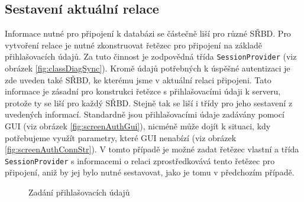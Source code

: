 \documentclass[czech,bachelor,public,dept460,male,oneside]{diploma}
\begin{document}
%			
	
	\subsection{Sestavení aktuální relace}
	Informace nutné pro připojení k databázi se částečně liší pro různé SŘBD. Pro vytvoření relace je nutné zkonstruovat řetězec pro připojení na základě přihlašovacích údajů. Za tuto činnost je zodpovědná třída \texttt{SessionProvider} (viz obrázek \ref{fig:classDiagSync}). Kromě údajů potřebných k úspěšné autentizaci je zde uveden také SŘBD, ke kterému jsme v aktuální relaci připojeni. Tato informace je zásadní pro konstrukci řetězce s přihlašovacími údaji k serveru, protože ty se liší pro každý SŘBD. Stejně tak se liší i třídy pro jeho sestavení z uvedených informací. Standardně jsou přihlašovacími údaje zadávány pomocí GUI (viz obrázek \ref{fig:screenAuthGui}), nicméně může dojít k situaci, kdy potřebujeme využít parametry, které GUI nenabízí (viz obrázek \ref{fig:screenAuthConnStr}). V tomto případě je možné zadat řetězec vlastní a třída \texttt{SessionProvider} s informacemi o relaci zprostředkovává tento řetězec pro připojení, aniž by jej bylo nutné sestavovat, jako je tomu v předchozím případě.
	
	\begin{figure}[!h]
		\centering
		\qquad
		\caption{Zadání přihlašovacích údajů}
	\end{figure}
	
\end{document}
